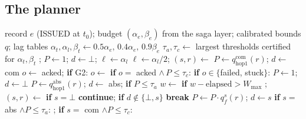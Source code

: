 \subsection{The \alg planner}
\label{sec:design-planner}

\begin{algorithm}[t]
\caption{\alg: resolve one ghost effect $e$}
\label{alg:recover}
\small
\begin{algorithmic}[1]
\Require record $e$ (\textsf{ISSUED} at $t_0$); budget $(\alpha_e,\beta_e)$ from the saga layer; calibrated bounds $q$; lag tables
\State $\alpha_t,\alpha_l,\beta_t\gets 0.5\alpha_e,\,0.4\alpha_e,\,0.9\beta_e$ 
\State $\tau_a,\tau_c\gets$ largest thresholds certified for $\alpha_t,\beta_t$ 
\State {}; $P\gets1$; $d\gets\bot$; $\ell\gets\alpha_l$
  \State $\ell\gets\alpha_l/2$; $(s,r)\gets$  
   $P\gets q^{\mathrm{com}}_{\text{hop1}}(r)$; $d\gets$ com
    \State $o\gets$ acked; \textbf{if} G2: $o\gets$  
    \State \textbf{if} $o=$ acked $\wedge\,P\le\tau_c$: \Return {}
    \State \textbf{if} $o\in\{$failed, stuck$\}$: $P\gets1$; $d\gets\bot$ 
   $P\gets q^{\mathrm{abs}}_{\text{hop1}}(r)$; $d\gets$ abs; \textbf{if} $P\le\tau_a$ \Return {}
  \EndIf
\EndIf
{}
  \State $w\gets$  
  \State \textbf{if} $w-\text{elapsed}>W_{\max}$ \Return {}; 
\EndIf
{}
  \State $(s,r)\gets$  
  \State \textbf{if} $s=\bot$ \textbf{continue}; \textbf{if} $d\notin\{\bot,s\}$ \textbf{break}
  \State $P\gets P\cdot q^{s}_f(r)$; $d\gets s$
  \State \textbf{if} $s=$ abs $\wedge P\le\tau_a$: ; \Return {}
  \State \textbf{if} $s=$ com $\wedge P\le\tau_c$: \Return {}
\EndFor
\State \Return {} 
\end{algorithmic}
\end{algorithm}


